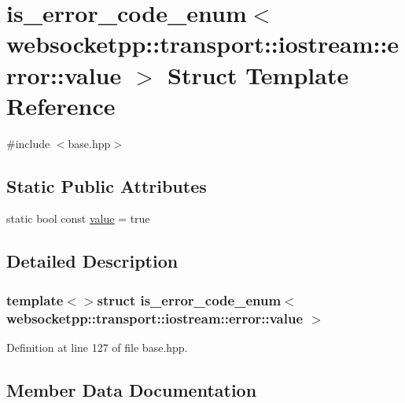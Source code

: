 \hypertarget{structis__error__code__enum_3_01websocketpp_1_1transport_1_1iostream_1_1error_1_1value_01_4}{}\section{is\+\_\+error\+\_\+code\+\_\+enum$<$ websocketpp\+:\+:transport\+:\+:iostream\+:\+:error\+:\+:value $>$ Struct Template Reference}
\label{structis__error__code__enum_3_01websocketpp_1_1transport_1_1iostream_1_1error_1_1value_01_4}


{\ttfamily \#include $<$base.\+hpp$>$}

\subsection*{Static Public Attributes}
\begin{DoxyCompactItemize}
\item 
static bool const \hyperlink{structis__error__code__enum_3_01websocketpp_1_1transport_1_1iostream_1_1error_1_1value_01_4_a8d3f807aad82dad37582b8331d2d077a}{value} = true
\end{DoxyCompactItemize}


\subsection{Detailed Description}
\subsubsection*{template$<$$>$struct is\+\_\+error\+\_\+code\+\_\+enum$<$ websocketpp\+::transport\+::iostream\+::error\+::value $>$}



Definition at line 127 of file base.\+hpp.



\subsection{Member Data Documentation}
\hypertarget{structis__error__code__enum_3_01websocketpp_1_1transport_1_1iostream_1_1error_1_1value_01_4_a8d3f807aad82dad37582b8331d2d077a}{}
